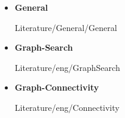 \begin{frame}{\LectureFurtherLiterature}
  \begin{itemize}
    \item
      \textbf{General}
      \begin{btSect}{Literature/General/General}
        \btPrintAll
      \end{btSect}
  \end{itemize}
\end{frame}


\begin{frame}{\LectureFurtherLiterature}
  \begin{itemize}
    \item
      \textbf{Graph-Search}
      \begin{btSect}{Literature/eng/GraphSearch}
        \btPrintAll
      \end{btSect}
    \item
      \textbf{Graph-Connectivity}
      \begin{btSect}{Literature/eng/Connectivity}
        \btPrintAll
      \end{btSect}
  \end{itemize}
\end{frame}